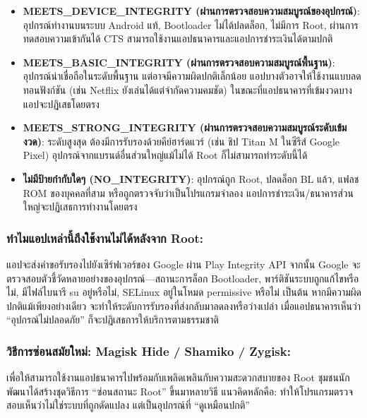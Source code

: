 \begin{itemize}
  \item \textbf{MEETS\_DEVICE\_INTEGRITY (ผ่านการตรวจสอบความสมบูรณ์ของอุปกรณ์)}: อุปกรณ์ทำงานบนระบบ Android แท้, Bootloader ไม่ได้ปลดล็อก, ไม่มีการ Root, ผ่านการทดสอบความเข้ากันได้ CTS สามารถใช้งานแอปธนาคารและแอปการชำระเงินได้ตามปกติ
  \item \textbf{MEETS\_BASIC\_INTEGRITY (ผ่านการตรวจสอบความสมบูรณ์พื้นฐาน)}: อุปกรณ์น่าเชื่อถือในระดับพื้นฐาน แต่อาจมีความผิดปกติเล็กน้อย แอปบางตัวอาจให้ใช้งานแบบลดทอนฟังก์ชัน (เช่น Netflix ยังเล่นได้แต่จำกัดความคมชัด) ในขณะที่แอปธนาคารที่เข้มงวดบางแอปจะปฏิเสธโดยตรง
  \item \textbf{MEETS\_STRONG\_INTEGRITY (ผ่านการตรวจสอบความสมบูรณ์ระดับเข้มงวด)}: ระดับสูงสุด ต้องมีการรับรองด้วยคีย์ฮาร์ดแวร์ (เช่น ชิป Titan M ในซีรีส์ Google Pixel) อุปกรณ์จากแบรนด์อื่นส่วนใหญ่แม้ไม่ได้ Root ก็ไม่สามารถทำระดับนี้ได้
  \item \textbf{ไม่มีป้ายกำกับใดๆ (NO\_INTEGRITY)}: อุปกรณ์ถูก Root, ปลดล็อก BL แล้ว, แฟลช ROM ของบุคคลที่สาม หรือถูกตรวจจับว่าเป็นโปรแกรมจำลอง แอปการชำระเงิน/ธนาคารส่วนใหญ่จะปฏิเสธการทำงานโดยตรง
\end{itemize}

\subsubsection*{ทำไมแอปเหล่านี้ถึงใช้งานไม่ได้หลังจาก Root:}

แอปจะส่งคำขอรับรองไปยังเซิร์ฟเวอร์ของ Google ผ่าน Play Integrity API จากนั้น Google จะตรวจสอบตัวชี้วัดหลายอย่างของอุปกรณ์—สถานะการล็อก Bootloader, พาร์ติชันระบบถูกแก้ไขหรือไม่, มีไฟล์ไบนารี su อยู่หรือไม่, SELinux อยู่ในโหมด permissive หรือไม่ เป็นต้น หากมีความผิดปกติแม้เพียงอย่างเดียว จะทำให้ระดับการรับรองที่ส่งกลับมาลดลงหรือว่างเปล่า เมื่อแอปธนาคารเห็นว่า “อุปกรณ์ไม่ปลอดภัย” ก็จะปฏิเสธการให้บริการตามธรรมชาติ

\subsubsection*{วิธีการซ่อนสมัยใหม่: Magisk Hide / Shamiko / Zygisk:}

เพื่อให้สามารถใช้งานแอปธนาคารไปพร้อมกับเพลิดเพลินกับความสะดวกสบายของ Root ชุมชนนักพัฒนาได้สร้างชุดวิธีการ “ซ่อนสถานะ Root” ขึ้นมาหลายวิธี แนวคิดหลักคือ: ทำให้โปรแกรมตรวจสอบเห็นว่าไม่ใช่ระบบที่ถูกดัดแปลง แต่เป็นอุปกรณ์ที่ “ดูเหมือนปกติ”

